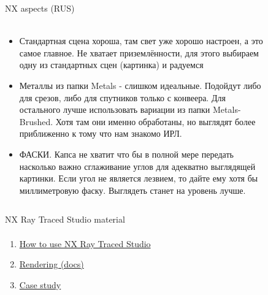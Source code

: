\documentclass[aspectratio=169]{beamer}
\begin{document}
\begin{frame}[t]{NX aspects (RUS)}
\framesubtitle{}
\begin{columns}[T,onlytextwidth]
    \begin{column}{0.69\textwidth}
        \begin{itemize}
            \scriptsize
            \item Стандартная сцена хороша, там свет уже хорошо настроен, а это самое главное. Не хватает приземлённости, для этого выбираем одну из стандартных сцен (картинка) и радуемся
            \item Металлы из папки Metals - слишком идеальные. Подойдут либо для срезов, либо для спутников только с конвеера. Для остального лучше использовать вариации из папки Metals-Brushed. Хотя там они именно обработаны, но выглядят более приближенно к тому что нам знакомо ИРЛ.
            \item ФАСКИ. Капса не хватит что бы в полной мере передать насколько важно сглаживание углов для адекватно выглядящей картинки. Если угол не является лезвием, то дайте ему хотя бы миллиметровую фаску. Выглядеть станет на уровень лучше.
        \end{itemize}
    \end{column}
    \begin{column}{0.29\textwidth}
        \begin{figure}[H]
            \centering\includegraphics[height=5.5cm,width=1\textwidth,keepaspectratio]{standard_scence.jpg}
            \label{fig:standard_scence.jpg}
        \end{figure}
    \end{column}
\end{columns}
\end{frame}

\begin{frame}[t]{NX Ray Traced Studio material}
\framesubtitle{}
    \begin{enumerate}
        \item \href{https://youtu.be/uyGHuxEY5Gk}{How to use NX Ray Traced Studio}
        \item \href{https://docs.sw.siemens.com/en-US/doc/209349590/PL20200605195244930.viewing_rendering/xid1219739}{Rendering (docs)}
        \item \href{https://youtu.be/qPT449FupKU}{Case study}
    \end{enumerate}
\end{frame}
\end{document}
